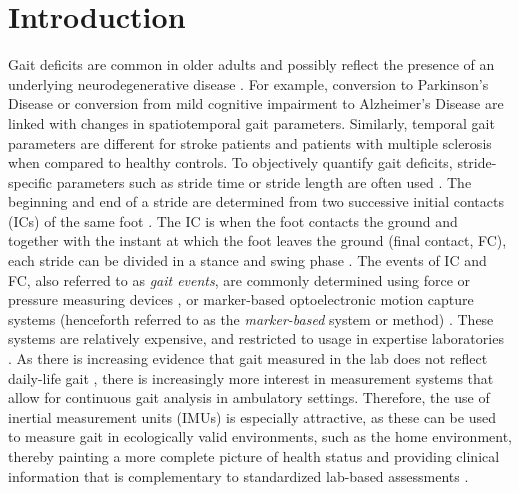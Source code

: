 \documentclass[sensors,article,submit,pdftex,moreauthors]{Definitions/mdpi}
\begin{document}
\section{Introduction}
Gait deficits are common in older adults and possibly reflect the presence of an underlying neurodegenerative disease \cite{Snijders2007,Hodgins2008}. For example, conversion to Parkinson's Disease \cite{DelDin2019} or conversion from mild cognitive impairment to Alzheimer's Disease \cite{Koenig2017,Bertoli2018} are linked with changes in spatiotemporal gait parameters. Similarly, temporal gait parameters are different for stroke patients \cite{SchroederVon1995,Mohan2021} and patients with multiple sclerosis \cite{Griskevicius2016,Flachenecker2019} when compared to healthy controls. To objectively quantify gait deficits, stride-specific parameters such as stride time or stride length are often used \cite{Hannink2016}. The beginning and end of a stride are determined from two successive initial contacts (ICs) of the same foot \cite{Perry2010,Whittle2012}. The IC is when the foot contacts the ground and together with the instant at which the foot leaves the ground (final contact, FC), each stride can be divided in a stance and swing phase \cite{Rueterbories2010,Bruening2014}.  The events of IC and FC, also referred to as \emph{gait events}, are commonly determined using force or pressure measuring devices \cite{Bruening2014}, or marker-based optoelectronic motion capture systems (henceforth referred to as the \emph{marker-based} system or method) \cite{Chiari2005,Topley2020}. These systems are relatively expensive, and restricted to usage in expertise laboratories \cite{Iosa2016,Jarchi2018}. As there is increasing evidence that gait measured in the lab does not reflect daily-life gait \cite{Hillel2019,Warmerdam2020,Atrsaei2021}, there is increasingly more interest in measurement systems that allow for continuous gait analysis in ambulatory settings. Therefore, the use of inertial measurement units (IMUs) is especially attractive, as these can be used to measure gait in ecologically valid environments, such as the home environment, thereby painting a more complete picture of health status \cite{DelDin2016,Shah2020} and providing clinical information that is complementary to standardized lab-based assessments \cite{Warmerdam2020,Fasano2020,Atrsaei2021,Corra2021}.
\end{document}
